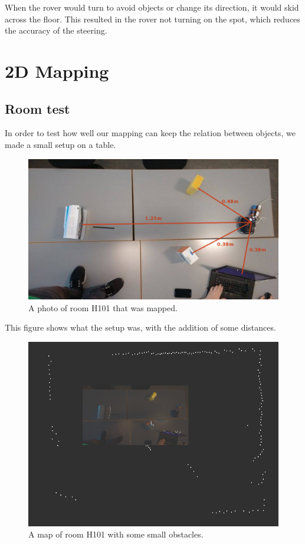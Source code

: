 When the rover would turn to avoid objects or change its direction, it would skid across the floor. This resulted in the rover not turning on the spot, which reduces the accuracy of the steering.

\clearpage
\section{2D Mapping}

\subsection{Room test}
In order to test how well our mapping can keep the relation between objects, we made a small setup on a table.

\begin{figure}[H]
	\centering
	\includegraphics[scale=.4]{images/h101-photo.jpg}
	\caption{A photo of room H101 that was mapped.}
	\label{fig:internallidar}
\end{figure}
	
This figure shows what the setup was, with the addition of some distances.


\begin{figure}[H]
	\centering
	\includegraphics[scale=.4]{images/h101_obstacles_overlay.png}
	\caption{A map of room H101 with some small obstacles.}
	\label{fig:internallidar}
\end{figure}
	
